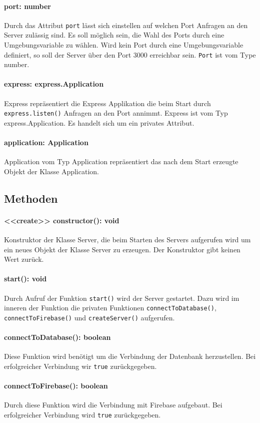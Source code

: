 \documentclass[parskip=full]{scrartcl}
\begin{document}
\paragraph{port: number}Durch das Attribut \texttt{port} lässt sich einstellen auf welchen Port Anfragen an den Server zulässig sind. Es soll möglich sein, die Wahl des Ports durch eine Umgebungsvariable zu wählen. Wird kein Port durch eine Umgebungsvariable definiert, so soll der Server über den Port 3000 erreichbar sein.
\texttt{Port} ist vom Type number.
\paragraph{express: express.Application}Express repräsentiert die Express Applikation die beim Start durch \texttt{express.listen()} Anfragen an den Port annimmt.
Express ist vom Typ express.Application. Es handelt sich um ein privates Attribut.
\paragraph{application: Application}Application vom Typ Application repräsentiert das nach dem Start erzeugte Objekt der Klasse Application.

\subsection*{Methoden}
\paragraph{<<create>> constructor(): void}Konstruktor der Klasse Server, die beim Starten des Servers aufgerufen wird um ein neues Objekt der Klasse Server zu erzeugen. Der Konstruktor gibt keinen Wert zurück.
\paragraph{start(): void}Durch Aufruf der Funktion \texttt{start()} wird der Server gestartet. Dazu wird im inneren der Funktion die privaten Funktionen \texttt{connectToDatabase()}, \texttt{connectToFirebase()} und \texttt{createServer()} aufgerufen.
\paragraph{connectToDatabase(): boolean}Diese Funktion wird benötigt um die Verbindung der Datenbank herzustellen. Bei erfolgreicher Verbindung wir \texttt{true} zurückgegeben.
\paragraph{connectToFirebase(): boolean}Durch diese Funktion wird die Verbindung mit Firebase aufgebaut. Bei erfolgreicher Verbindung wird \texttt{true} zurückgegeben.
\end{document}
